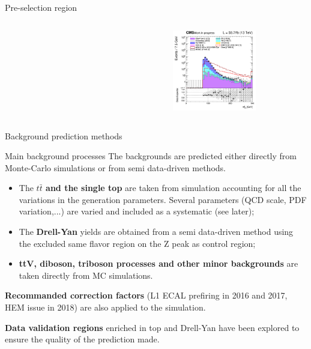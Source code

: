 \documentclass[8pt]{beamer}
\begin{document}
\begin{frame}{Pre-selection region}
\begin{columns}
\begin{column}{0.33\textwidth}
\begin{center}
    		\end{center}		
		\end{column}
		\begin{column}{0.33\textwidth}
			\begin{center}
     			\includegraphics[width=1.0\textwidth, height=100pt]{figs/2018/SmearSR-ttDM-scalar100/log_cratio_topCR_ll_mt2ll.png}
    		\end{center}		
		\end{column}
\end{columns} \vfill
\end{frame}









\begin{frame}[standout]
Background prediction methods
\end{frame}

\begin{frame}{Main background processes}
\justifying
The backgrounds are predicted either directly from \alert{Monte-Carlo simulations or from semi data-driven methods}.

\begin{itemize}
\justifying
\item The \textbf{$t \bar t$ and the single top} are taken from simulation accounting for all the variations in the generation parameters. Several parameters (QCD scale, PDF variation,...) are varied and included as a systematic (see later);
\item The \textbf{Drell-Yan} yields are obtained from a semi data-driven method using the excluded same flavor region on the Z peak as control region;
\item \textbf{ttV, diboson, triboson processes and other minor backgrounds} are taken directly from MC simulations.
\end{itemize} \vfill

\textbf{Recommanded correction factors} (L1 ECAL prefiring in 2016 and 2017, HEM issue in 2018) are also applied to the simulation. \vfill 

\textbf{Data validation regions} enriched in top and Drell-Yan have been explored to ensure the quality of the prediction made.\vfill
\end{frame}
\end{document}
